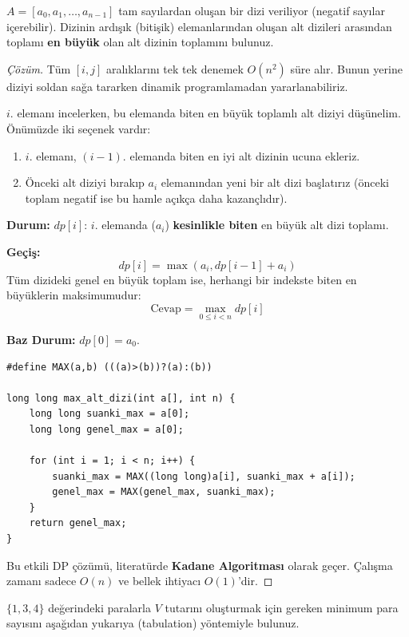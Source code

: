 \begin{example}
$A = [a_0, a_1, \dots, a_{n-1}]$ tam sayılardan oluşan bir dizi veriliyor (negatif sayılar içerebilir). Dizinin ardışık (bitişik) elemanlarından oluşan alt dizileri arasından toplamı \textbf{en büyük} olan alt dizinin toplamını bulunuz.
\end{example}

\begin{proof}[Çözüm]
Tüm $[i, j]$ aralıklarını tek tek denemek $O(n^2)$ süre alır. Bunun yerine diziyi soldan sağa tararken dinamik programlamadan yararlanabiliriz.

$i$. elemanı incelerken, bu elemanda biten en büyük toplamlı alt diziyi düşünelim. Önümüzde iki seçenek vardır:
\begin{enumerate}
    \item $i$. elemanı, $(i-1)$. elemanda biten en iyi alt dizinin ucuna ekleriz.
    \item Önceki alt diziyi bırakıp $a_i$ elemanından yeni bir alt dizi başlatırız (önceki toplam negatif ise bu hamle açıkça daha kazançlıdır).
\end{enumerate}

\textbf{Durum:}
$dp[i]$: $i$. elemanda ($a_i$) \textbf{kesinlikle biten} en büyük alt dizi toplamı.

\textbf{Geçiş:}
\[
dp[i] = \max(a_i, dp[i-1] + a_i)
\]
Tüm dizideki genel en büyük toplam ise, herhangi bir indekste biten en büyüklerin maksimumudur:
\[
\text{Cevap} = \max_{0 \le i < n} dp[i]
\]

\textbf{Baz Durum:}
$dp[0] = a_0$.

\begin{lstlisting}[language=CTemel]
#define MAX(a,b) (((a)>(b))?(a):(b))

long long max_alt_dizi(int a[], int n) {
    long long suanki_max = a[0];
    long long genel_max = a[0];
    
    for (int i = 1; i < n; i++) {
        suanki_max = MAX((long long)a[i], suanki_max + a[i]);
        genel_max = MAX(genel_max, suanki_max);
    }
    return genel_max;
}
\end{lstlisting}
Bu etkili DP çözümü, literatürde \textbf{Kadane Algoritması} olarak geçer. Çalışma zamanı sadece $O(n)$ ve bellek ihtiyacı $O(1)$'dir.
\end{proof}

\begin{example}
$\{1, 3, 4\}$ değerindeki paralarla $V$ tutarını oluşturmak için gereken minimum para sayısını aşağıdan yukarıya (tabulation) yöntemiyle bulunuz.
\end{example}

